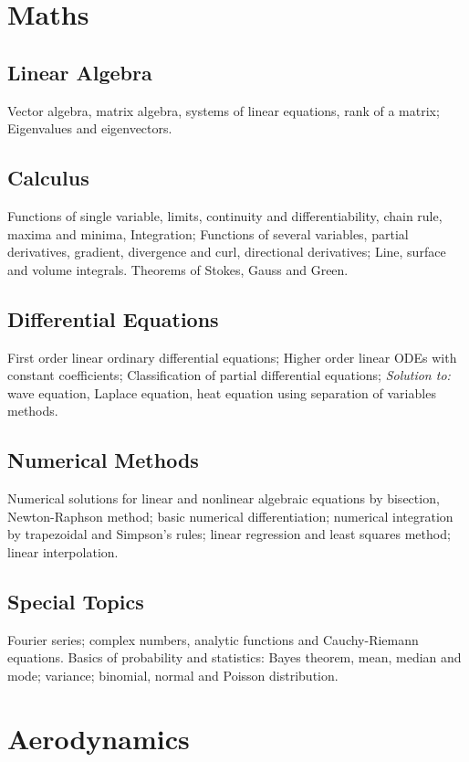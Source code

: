 \section{Maths}
\subsection{Linear Algebra}
Vector algebra, matrix algebra, systems of linear equations, rank of a matrix; Eigenvalues and eigenvectors.

\subsection{Calculus}
Functions of single variable, limits, continuity and differentiability, chain rule, maxima and minima, Integration; Functions of several variables, partial derivatives, gradient, divergence and curl, directional derivatives; Line, surface and volume integrals. Theorems of Stokes, Gauss and Green.

\subsection{Differential Equations}
First order linear ordinary differential equations; Higher order linear ODEs with constant coefficients; Classification of partial differential equations; \textit{Solution to:} wave equation, Laplace equation, heat equation using separation of variables methods.

\subsection{Numerical Methods}
Numerical solutions for linear and nonlinear algebraic equations by bisection, Newton-Raphson method; basic numerical differentiation; numerical integration by trapezoidal and Simpson's rules; linear regression and least squares method; linear interpolation.

\subsection{Special Topics}
Fourier series; complex numbers, analytic functions and Cauchy-Riemann equations. Basics of probability and statistics: Bayes theorem, mean, median and mode; variance; binomial, normal and Poisson distribution.

\section{Aerodynamics}

